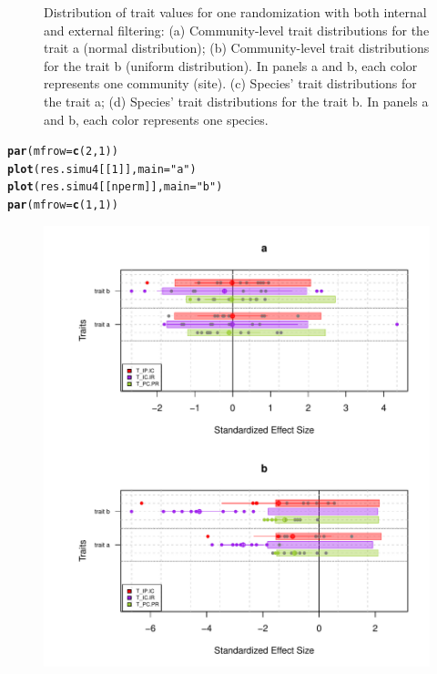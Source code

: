 \documentclass[12pt]{article}\usepackage[]{graphicx}\usepackage[]{color}
\makeatletter
\def\maxwidth{ %
  \ifdim\Gin@nat@width>\linewidth
    \linewidth
  \else
    \Gin@nat@width
  \fi
}
\newcommand{\hlnum}[1]{\textcolor[rgb]{0.686,0.059,0.569}{#1}}%
\newcommand{\hlstr}[1]{\textcolor[rgb]{0.192,0.494,0.8}{#1}}%
\newcommand{\hlstd}[1]{\textcolor[rgb]{0.345,0.345,0.345}{#1}}%
\newcommand{\hlkwc}[1]{\textcolor[rgb]{0.333,0.667,0.333}{#1}}%
\newcommand{\hlkwd}[1]{\textcolor[rgb]{0.737,0.353,0.396}{\textbf{#1}}}%
\newenvironment{kframe}{%
 \def\at@end@of@kframe{}%
 \ifinner\ifhmode%
  \def\at@end@of@kframe{\end{minipage}}%
  \begin{minipage}{\columnwidth}%
 \fi\fi%
 \def\FrameCommand##1{\hskip\@totalleftmargin \hskip-\fboxsep
 \colorbox{shadecolor}{##1}\hskip-\fboxsep
     \hskip-\linewidth \hskip-\@totalleftmargin \hskip\columnwidth}%
 \MakeFramed {\advance\hsize-\width
   \@totalleftmargin\z@ \linewidth\hsize
   \@setminipage}}%
 {\par\unskip\endMakeFramed%
 \at@end@of@kframe}
\newenvironment{knitrout}{}{} %
\makeatother
\begin{document}
\begin{knitrout}
\begin{figure}
{}

\caption[Distribution of trait values for one randomization with both internal and external filtering]{Distribution of trait values for one randomization with both internal and external filtering: (a) Community-level trait distributions for the trait a (normal distribution); (b) Community-level trait distributions for the trait b (uniform distribution). In panels a and b, each color represents one community (site). (c) Species' trait distributions for the trait a; (d) Species' trait distributions for the trait b. In panels a and b, each color represents one species.}\label{fig:InEx_Filter_plots}
\end{figure}


\end{knitrout}

\begin{knitrout}\small
{}\color{fgcolor}\begin{kframe}
\begin{alltt}
\hlkwd{par}\hlstd{(}\hlkwc{mfrow}\hlstd{=}\hlkwd{c}\hlstd{(}\hlnum{2}\hlstd{,} \hlnum{1}\hlstd{))}
\hlkwd{plot}\hlstd{(res.simu4[[}\hlnum{1}\hlstd{]],} \hlkwc{main} \hlstd{=} \hlstr{"a"}\hlstd{)}
\hlkwd{plot}\hlstd{(res.simu4[[nperm]],} \hlkwc{main} \hlstd{=} \hlstr{"b"}\hlstd{)}
\hlkwd{par}\hlstd{(}\hlkwc{mfrow}\hlstd{=}\hlkwd{c}\hlstd{(}\hlnum{1}\hlstd{,} \hlnum{1}\hlstd{))}
\end{alltt}
\end{kframe}\begin{figure}

{\centering \includegraphics[width=\maxwidth]{figure/InEx_Filter_plots_Tstats-1} 

}
\end{figure}
\end{knitrout}
\end{document}
